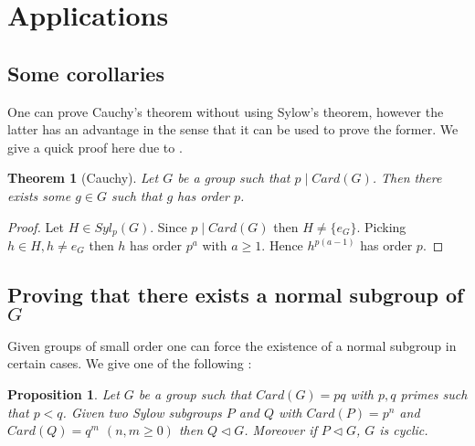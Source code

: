 \documentclass{article}
\theoremstyle{definition}
\theoremstyle{plain}
\newtheorem{proposition}[subsubsection]{Proposition}
\theoremstyle{plain}
\theoremstyle{plain}
\theoremstyle{plain}
\theoremstyle{definition}
\theoremstyle{plain}
\newtheorem{thmeng}[subsubsection]{Theorem}
\theoremstyle{plain}
\begin{document}
\clearpage
{}
\section{Applications}

\subsection{Some corollaries}

One can prove Cauchy's theorem without using Sylow's theorem, however the latter has an advantage in the sense that it can be used to prove the former. We give a quick proof here due to \cite{serre1979ens}.

\begin{thmeng}[Cauchy]
	Let \( G \) be a group such that \( p \mid Card(G) \). Then there exists some \( g \in G \) such that \( g \) has order \( p \).
\end{thmeng}

\begin{proof}
	Let \( H \in Syl_p(G) \). Since \( p \mid Card(G) \) then \( H \neq \{e_G\} \). 
	Picking \( h \in H, h \neq e_G \)
	then \( h \)  has order \( p^{a} \) with \( a \geq 1 \). 
	Hence \( h^{p(a-1)} \) has order \( p \).
\end{proof}

\subsection{Proving that there exists a normal subgroup of \ensuremath{G}}

Given groups of small order one can force the existence of a normal subgroup in certain cases. We give one of the following :

\begin{proposition}\label{primes}
	Let \( G \) be a group such that \( Card(G) = pq \) with \( p,q \) primes such that \( p < q \). Given two Sylow subgroups \( P \) and \( Q \) with \( Card(P) = p^{n} \) and \( Card(Q) = q^{m} \) \( (n, m \geq 0) \) then \( Q \triangleleft G \). 
	Moreover if \( P \triangleleft G \), \( G \) is cyclic.
\end{proposition}
\end{document}
